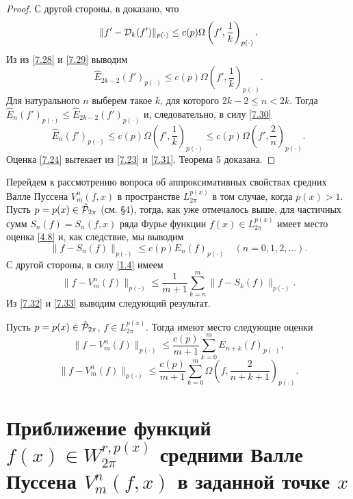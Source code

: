 \begin{proof}
С другой стороны, в \cite{Shar6} доказано, что
\begin{equation}\label{7.29}
    \|f'-{\cal D}_k (f')\|_{p(\cdot)}\le c(p)\Omega\left(f',\frac1{k}\right)_{p(\cdot)}.
\end{equation}
Из  из \eqref{7.28} и \eqref{7.29} выводим
 \begin{equation}\label{7.30}
    {\hat E}_{2k-2}(f')_{p(\cdot)}\le c(p)\Omega\left(f',\frac1{k}\right)_{p(\cdot)}.
\end{equation}
Для натурального $n$ выберем такое $k$, для которого $2k-2\le n < 2k$. Тогда ${\hat E}_{n}(f')_{p(\cdot)}\le{\hat E}_{2k-2}(f')_{p(\cdot)}$
и, следовательно, в силу \eqref{7.30}
\begin{equation}\label{7.31}
    {\hat E}_{n}(f')_{p(\cdot)}\le c(p)\Omega\left(f',\frac1{k}\right)_{p(\cdot)}\le c(p)\Omega\left(f',\frac2{n}\right)_{p(\cdot)}.
\end{equation}
Оценка \eqref{7.24} вытекает из \eqref{7.23} и \eqref{7.31}. Теорема 5 доказана.
\end{proof}

Перейдем к рассмотрению вопроса об аппроксимативных свойствах средних Валле Пуссена $V_m^n(f,x)$ в пространстве  $L^{p(x)}_{2\pi}$
в том случае, когда  $p(x)>1$. Пусть  $p=p(x)\in\hat{\cal  P}_{2\pi}$ (см. \S 4), тогда, как уже отмечалось выше, для частичных сумм
 $S_n(f)=S_n(f,x)$ ряда Фурье функции $f(x)\in L^{p(x)}_{2\pi}$  имеет место  оценка \eqref{4.8} и, как следствие, мы выводим
\begin{equation}\label{7.32}
    \|f-S_n(f)\|_{p(\cdot)}\le c(p)E_n(f)_{p(\cdot)}\quad(n=0,1,2,\ldots).
 \end{equation}
С другой стороны, в силу \eqref{1.4} имеем
\begin{equation}\label{7.33}
  \|f-V_m^n(f)\|_{p(\cdot)}\le \frac{1}{m+1}\sum_{k=n}^m\|f-S_k(f)\|_{p(\cdot)}.
 \end{equation}
Из \eqref{7.32} и \eqref{7.33} выводим следующий результат.
\begin{theorem}\label{t6}
Пусть  $p=p(x)\in\hat{\cal  P}_{2\pi}$,  $f\in L^{p(x)}_{2\pi}$. Тогда имеют место следующие оценки
$$
   \|f-V_m^n(f)\|_{p(\cdot)}\le \frac{c(p)}{m+1}\sum_{k=0}^mE_{n+k}(f)_{p(\cdot)},
$$
$$
   \|f-V_m^n(f)\|_{p(\cdot)}\le \frac{c(p)}{m+1}\sum_{k=0}^m\Omega\left(f,\frac2{n+k+1}\right)_{p(\cdot)}.
$$
\end{theorem}
\section{Приближение функций $f(x)\in W^{r,p(x)}_{2\pi}$ средними Валле Пуссена $V_m^n(f,x)$ в заданной точке $x$  }\label{s8}

